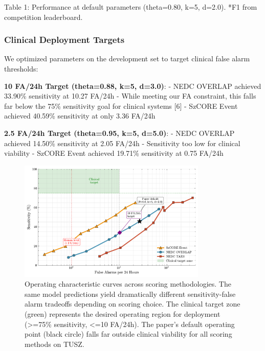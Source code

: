 \documentclass[
]{article}
\begin{document}
Table 1: Performance at default parameters (theta=0.80, k=5, d=2.0). *F1
from competition leaderboard.

\hypertarget{clinical-deployment-targets}{%
\subsubsection{Clinical Deployment
Targets}\label{clinical-deployment-targets}}

We optimized parameters on the development set to target clinical false
alarm thresholds:

\textbf{10 FA/24h Target (theta=0.88, k=5, d=3.0)}: - NEDC OVERLAP
achieved 33.90\% sensitivity at 10.27 FA/24h - While meeting our FA
constraint, this falls far below the 75\% sensitivity goal for clinical
systems {[}6{]} - SzCORE Event achieved 40.59\% sensitivity at only 3.36
FA/24h

\textbf{2.5 FA/24h Target (theta=0.95, k=5, d=5.0)}: - NEDC OVERLAP
achieved 14.50\% sensitivity at 2.05 FA/24h - Sensitivity too low for
clinical viability - SzCORE Event achieved 19.71\% sensitivity at 0.75
FA/24h

\begin{figure}
\hypertarget{fig:operating-curves}{%
\centering
\includegraphics[width=0.8\textwidth,height=\textheight]{figures/output/arxiv/FIGURE_4_operating_curves.pdf}
\caption{Operating characteristic curves across scoring methodologies.
The same model predictions yield dramatically different
sensitivity-false alarm tradeoffs depending on scoring choice. The
clinical target zone (green) represents the desired operating region for
deployment (\textgreater=75\% sensitivity, \textless=10 FA/24h). The
paper's default operating point (black circle) falls far outside
clinical viability for all scoring methods on
TUSZ.}\label{fig:operating-curves}
}
\end{figure}
\end{document}
